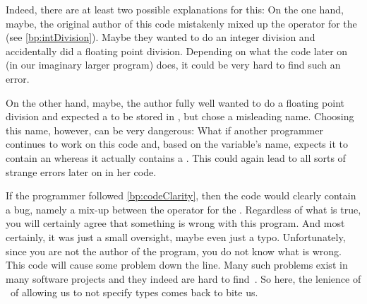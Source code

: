 Indeed, there are at least two possible explanations for this:
On the one hand, maybe, the original author of this code mistakenly mixed up the \pythonilIdx{/} operator for the \pythonilIdx{//} (see \cref{bp:intDivision}).
Maybe they wanted to do an integer division and accidentally did a floating point division.
Depending on what the code later on (in our imaginary larger program) does, it could be very hard to find such an error.

On the other hand, maybe, the author fully well wanted to do a floating point division and expected a  to be stored in , but chose a misleading name.
Choosing this name, however, can be very dangerous:
What if another programmer continues to work on this code and, based on the variable's name, expects it to contain an  whereas it actually contains a .
This could again lead to all sorts of strange errors later on in her code.


If the programmer followed \cref{bp:codeClarity}, then the code would clearly contain a bug, namely a mix-up between the \pythonilIdx{/} operator for the \pythonilIdx{//}.
Regardless of what is true, you will certainly agree that something is wrong with this program.
And most certainly, it was just a small oversight, maybe even just a typo.
Unfortunately, since you are not the author of the program, you do not know what is wrong.
This code will cause some problem down the line.
Many such problems exist in many software projects and they indeed are hard to find~\cite{KCVM2022AESOTRDIPP}.
So here, the lenience of \python\ of allowing us to not specify types comes back to bite us.


